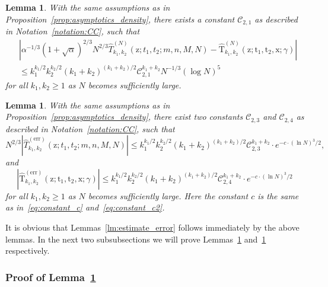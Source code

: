 \documentclass{article}
\newtheorem{lm}[thm]{Lemma}
\numberwithin{equation}{section}
\newcommand{\CC}{\mathcal{C}}
\newcommand{\exe}{\mathrm{err}}
\begin{document}
\begin{lm}
	\label{lm:hat_T_main}
With the same assumptions as in Proposition~\ref{prop:asymptotics_density}, there exists a constant $\CC_{2,1}$ as described in Notation~\ref{notation:CC}, such that
\begin{equation*}
	\begin{split}
	&\left|\alpha^{-1/3}(1+\sqrt{\alpha})^{2/3}N^{2/3}\hat T_{k_1,k_2}^{(N)}(\mathrm{z};t_1,t_2;m,n,M,N)
	-\mathrm{\hat T}_{k_1,k_2}^{(N)}(\mathrm{z};\mathrm{t}_1,\mathrm{t}_2,\mathrm{x};\gamma)\right| \\
	&\le k_1^{k_1/2}k_2^{k_2/2}(k_1+k_2)^{(k_1+k_2)/2}\CC_{2,1}^{k_1+k_2}N^{-1/3}(\log N)^{5}
	\end{split}
\end{equation*}
for all $k_1,k_2\ge 1$ as $N$ becomes sufficiently large.
\end{lm}
\begin{lm}
	\label{lm:hat_T_err}
	With the same assumptions as in Proposition~\ref{prop:asymptotics_density}, there exist two constants $\CC_{2,3}$ and $\CC_{2,4}$ as described in Notation~\ref{notation:CC}, such that
	\begin{equation*}
		N^{2/3} \left|\hat T_{k_1,k_2}^{(\exe)}(\mathrm{z};t_1,t_2;m,n,M,N)\right| \le k_1^{k_1/2}k_2^{k_2/2}(k_1+k_2)^{(k_1+k_2)/2}\CC_{2,3}^{k_1+k_2}\cdot e^{-c\cdot (\ln N)^3/2},
	\end{equation*}
and
\begin{equation*}
	\left|\mathrm{\hat T}_{k_1,k_2}^{(\exe)}(\mathrm{z};\mathrm{t}_1,\mathrm{t}_2,\mathrm{x};\gamma)\right| \le k_1^{k_1/2}k_2^{k_2/2}(k_1+k_2)^{(k_1+k_2)/2}\CC_{2,4}^{k_1+k_2} \cdot  e^{-c\cdot (\ln N)^3/2}
\end{equation*}
for all $k_1,k_2\ge 1$ as $N$ becomes sufficiently large. Here the constant $c$ is the same as in~\eqref{eq:constant_c} and~\eqref{eq:constant_c2}.
\end{lm}

It is obvious that Lemmas~\ref{lm:estimate_error} follows immediately by the above lemmas. In the next two subsubsections we will prove Lemmas~\ref{lm:hat_T_main} and~\ref{lm:hat_T_err} respectively.

\subsubsection{Proof of Lemma~\ref{lm:hat_T_main}}
\end{document}
